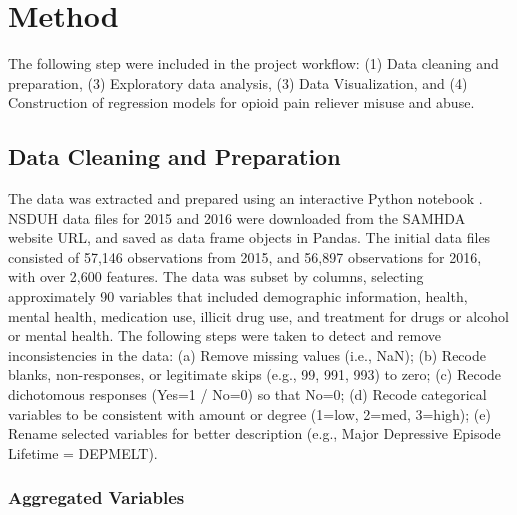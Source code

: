 \documentclass[sigconf]{acmart}
\begin{document}
\section{Method}

The following step were included in the project workflow: (1) Data cleaning and 
preparation, (3) Exploratory data analysis, (3) Data Visualization, and (4) 
Construction of regression models for opioid pain reliever misuse and abuse. 

\subsection{Data Cleaning and Preparation }

The data was extracted and prepared using an interactive Python notebook 
\cite{mckinney17}. NSDUH data files for 2015 and 2016 were downloaded from 
the SAMHDA website \cite{samhsa16} URL, and saved as data frame objects in 
Pandas. The initial data files consisted of 57,146 observations from 2015, 
and 56,897 observations for 2016, with over 2,600 features. The data was 
subset by columns, selecting approximately 90 variables that included 
demographic information, health, mental health, medication use, illicit drug 
use, and treatment for drugs or alcohol or mental health. The following steps 
were taken to detect and remove inconsistencies in the data: (a) Remove missing 
values (i.e., NaN); (b) Recode blanks, non-responses, or legitimate skips 
(e.g., 99, 991, 993) to zero; (c) Recode dichotomous responses (Yes=1 / 
No=0) so that No=0; (d) Recode categorical variables to be consistent with 
amount or degree (1=low, 2=med, 3=high); (e) Rename selected variables for 
better description (e.g., Major Depressive Episode Lifetime = DEPMELT).

\subsubsection{Aggregated Variables} 
\end{document}
